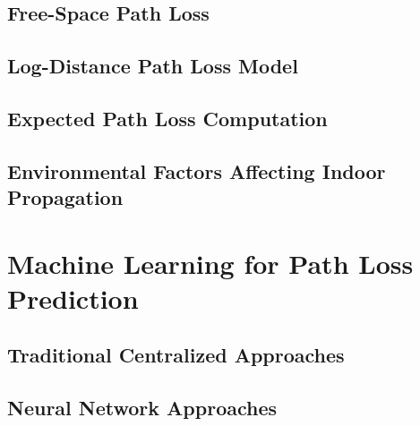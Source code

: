 \subsection{Free-Space Path Loss}

\subsection{Log-Distance Path Loss Model}

\subsection{Expected Path Loss Computation}

\subsection{Environmental Factors Affecting Indoor Propagation}

\section{Machine Learning for Path Loss Prediction}
\label{sec:ml-pathloss}

\subsection{Traditional Centralized Approaches}

\subsection{Neural Network Approaches}

